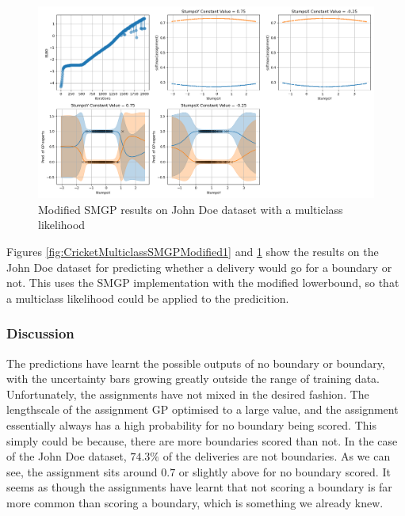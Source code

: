 \documentclass[12pt,a4paper]{report}
\theoremstyle{definition}
\begin{document}
\begin{figure}[H]
    \centering
    \includegraphics[width=\linewidth]{demo_JohnDoe_RightArmSeam_stumpsX_stumpsY_multi_class_2.png}
    \caption{Modified SMGP results on John Doe dataset with a multiclass likelihood}
    \label{fig:CricketMulticlassSMGPModified2}
\end{figure}

Figures \ref{fig:CricketMulticlassSMGPModified1} and \ref{fig:CricketMulticlassSMGPModified2} show the results on the John Doe dataset for predicting whether a delivery would go for a boundary or not.
This uses the SMGP implementation with the modified lowerbound, so that a multiclass likelihood could be applied to the predicition.

\subsubsection{Discussion}

The predictions have learnt the possible outputs of no boundary or boundary, with the uncertainty bars growing greatly outside the range of training data.
Unfortunately, the assignments have not mixed in the desired fashion. 
The lengthscale of the assignment GP optimised to a large value, and the assignment essentially always has a high probability for no boundary being scored.
This simply could be because, there are more boundaries scored than not.
In the case of the John Doe dataset, $74.3\%$ of the deliveries are not boundaries.
As we can see, the assignment sits around $0.7$ or slightly above for no boundary scored.
It seems as though the assignments have learnt that not scoring a boundary is far more common than scoring a boundary, which is something we already knew.
\end{document}
